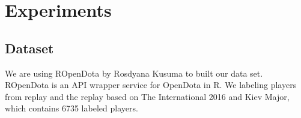 \section{Experiments}
\label{sec:exp}

\subsection{Dataset}
\label{sec:dataset}

We are using ROpenDota by Rosdyana Kusuma to built our data set. ROpenDota is an API wrapper service for OpenDota in R. We labeling players from replay and the replay based on The International 2016 and Kiev Major, which contains 6735 labeled players.